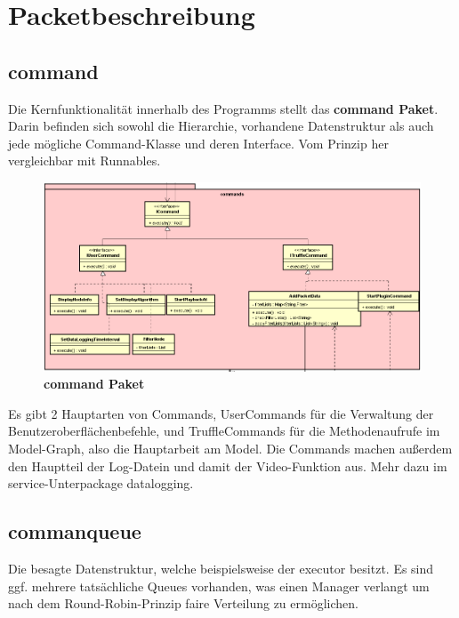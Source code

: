 \section{Packetbeschreibung}

\subsection{\textbf{\sppname}}

\subsection{\textbf{command}}

Die Kernfunktionalität innerhalb des Programms stellt das \textbf{command Paket}.
Darin befinden sich sowohl die Hierarchie, vorhandene Datenstruktur als auch jede
mögliche Command-Klasse und deren Interface. Vom Prinzip her vergleichbar mit
Runnables.\newline

\begin{figure}[H]
  \centering
  \includegraphics[width=\textwidth]{../diagramimages/commands.png}
  \caption{\textbf{command Paket}}
\end{figure}

Es gibt 2 Hauptarten von Commands, UserCommands für die Verwaltung der
Benutzeroberflächenbefehle, und TruffleCommands für die Methodenaufrufe im
Model-Graph, also die Hauptarbeit am Model. Die Commands machen außerdem den
Hauptteil der Log-Datein und damit der Video-Funktion aus. Mehr dazu im
service-Unterpackage datalogging.

\subsection*{\textbf{commanqueue}}
Die besagte Datenstruktur, welche beispielsweise der executor besitzt. Es
sind ggf. mehrere tatsächliche Queues vorhanden, was einen Manager verlangt
um nach dem Round-Robin-Prinzip faire Verteilung zu ermöglichen.



